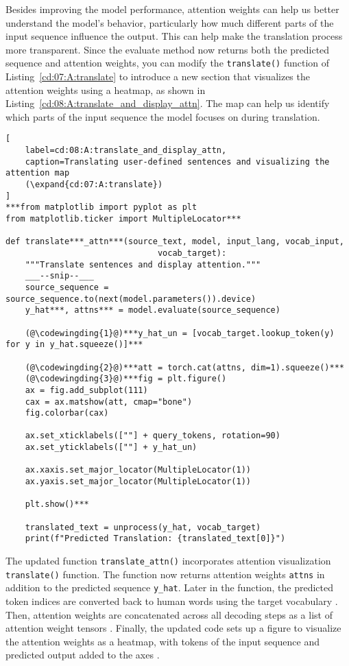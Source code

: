 Besides improving the model performance, attention weights can help us better understand the model's behavior, particularly how much different parts of the input sequence influence the output. This can help make the translation process more transparent.
Since the evaluate method now returns both the predicted sequence and attention weights, you can modify the \lstinline{translate()} function of Listing~\ref{cd:07:A:translate}
to introduce a new section that visualizes the attention weights using a heatmap, as shown in Listing~\ref{cd:08:A:translate_and_display_attn}. The map can help us identify which parts of the input sequence the model focuses on during translation.
\begin{lstlisting}[
    label=cd:08:A:translate_and_display_attn,
    caption=Translating user-defined sentences and visualizing the attention map
    (\expand{cd:07:A:translate})
]
***from matplotlib import pyplot as plt
from matplotlib.ticker import MultipleLocator***

def translate***_attn***(source_text, model, input_lang, vocab_input, 
                               vocab_target):
    """Translate sentences and display attention."""
    ___--snip--___
    source_sequence = source_sequence.to(next(model.parameters()).device)
    y_hat***, attns*** = model.evaluate(source_sequence)

    (@\codewingding{1}@)***y_hat_un = [vocab_target.lookup_token(y) for y in y_hat.squeeze()]***

    (@\codewingding{2}@)***att = torch.cat(attns, dim=1).squeeze()***
    (@\codewingding{3}@)***fig = plt.figure()
    ax = fig.add_subplot(111)
    cax = ax.matshow(att, cmap="bone")
    fig.colorbar(cax)

    ax.set_xticklabels([""] + query_tokens, rotation=90)
    ax.set_yticklabels([""] + y_hat_un)

    ax.xaxis.set_major_locator(MultipleLocator(1))
    ax.yaxis.set_major_locator(MultipleLocator(1))

    plt.show()***

    translated_text = unprocess(y_hat, vocab_target)
    print(f"Predicted Translation: {translated_text[0]}")
\end{lstlisting}
The updated function \lstinline{translate_attn()} incorporates attention visualization \lstinline{translate()} function. The function now returns attention weights \lstinline{attns} in addition to the predicted sequence \lstinline{y_hat}.
Later in the function, the predicted token indices are converted back to human words using the target vocabulary . Then, attention weights are concatenated across all decoding steps as a list of attention weight tensors . Finally, the updated code sets up a figure to visualize the attention weights as a heatmap, with tokens of the input sequence and predicted output added to the axes .

